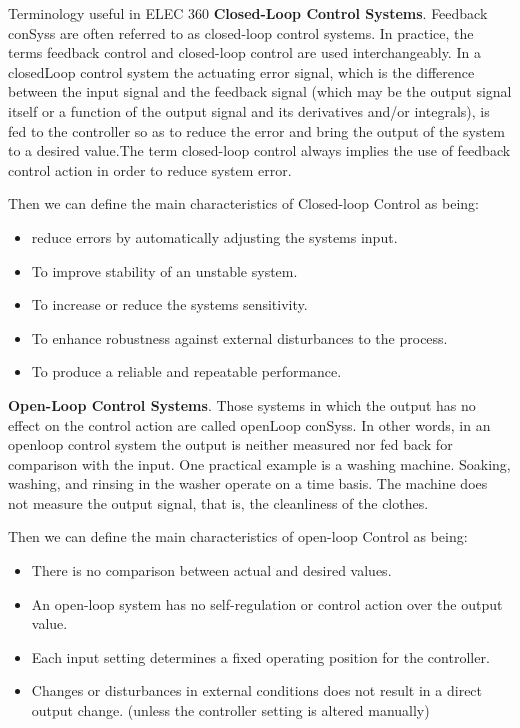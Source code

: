 \documentclass{beamer}
\begin{document}
\begin{frame}[allowframebreaks]{Terminology useful in ELEC 360}
\textbf{Closed-Loop Control Systems}. Feedback \glspl{conSys} are often referred to
as closed-loop control systems. In practice, the terms feedback control and closed-loop
control are used interchangeably. In a \gls{closedLoop} control system the actuating error
signal, which is the difference between the input signal and the feedback signal (which
may be the output signal itself or a function of the output signal and its derivatives
and/or integrals), is fed to the controller so as to reduce the error and bring the output
of the system to a desired value.The term closed-loop control always implies the use of
feedback control action in order to reduce system error. \hfill \break

Then we can define the main characteristics of Closed-loop Control as being:
\begin{itemize}
	\item reduce errors by automatically adjusting the systems input.
	\item To improve stability of an unstable system.
	\item To increase or reduce the systems sensitivity.
	\item To enhance robustness against external disturbances to the process.
	\item To produce a reliable and repeatable performance.
\end{itemize}
\textbf{Open-Loop Control Systems}. Those systems in which the output has no effect
on the control action are called \gls{openLoop} \glspl{conSys}. In other words, in an openloop control system the output is neither measured nor fed back for comparison with the
input. One practical example is a washing machine. Soaking, washing, and rinsing in the
washer operate on a time basis. The machine does not measure the output signal, that
is, the cleanliness of the clothes.  \hfill \break

Then we can define the main characteristics of open-loop Control as being:
\begin{itemize}
	\item There is no comparison between actual and desired values.
	\item An open-loop system has no self-regulation or control action over the output value.
	\item Each input setting determines a fixed operating position for the controller.
	\item Changes or disturbances in external conditions does not result in a direct output change.
(unless the controller setting is altered manually)
\end{itemize}


\end{frame}
\end{document}
